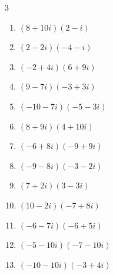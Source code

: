 \begin{multicols}{3}
\begin{enumerate}
        \phantom{$\displaystyle =-25-5i$}

  \item $\displaystyle (8+10i)(2-i)$

        \phantom{$\displaystyle =26+12i$}

  \item $\displaystyle (2-2i)(-4-i)$

        \phantom{$\displaystyle =-10+6i$}

  \item $\displaystyle (-2+4i)(6+9i)$

        \phantom{$\displaystyle =-48+6i$}

  \item $\displaystyle (9-7i)(-3+3i)$

        \phantom{$\displaystyle =-6+48i$}

  \item $\displaystyle (-10-7i)(-5-3i)$

        \phantom{$\displaystyle =29+65i$}

  \item $\displaystyle (8+9i)(4+10i)$

        \phantom{$\displaystyle =-58+116i$}

  \item $\displaystyle (-6+8i)(-9+9i)$

        \phantom{$\displaystyle =-18-126i$}

  \item $\displaystyle (-9-8i)(-3-2i)$

        \phantom{$\displaystyle =11+42i$}

  \item $\displaystyle (7+2i)(3-3i)$

        \phantom{$\displaystyle =27-15i$}

  \item $\displaystyle (10-2i)(-7+8i)$

        \phantom{$\displaystyle =-54+94i$}

  \item $\displaystyle (-6-7i)(-6+5i)$

        \phantom{$\displaystyle =71+12i$}

  \item $\displaystyle (-5-10i)(-7-10i)$

        \phantom{$\displaystyle =-65+120i$}

  \item $\displaystyle (-10-10i)(-3+4i)$


\end{enumerate}
\end{multicols}
